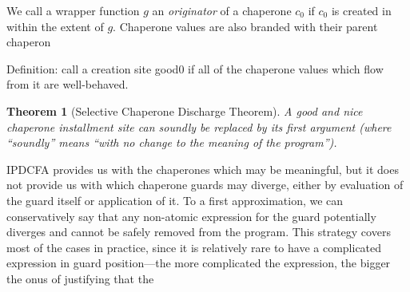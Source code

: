 \documentclass{sigplanconf}
\newtheorem{theorem}{Theorem}
\begin{document}
We call a wrapper function $g$ an \emph{originator} of a chaperone $c_0$ if $c_0$ is created in within the extent of $g$. Chaperone values are also branded with their parent chaperon

Definition: call a creation site good0 if all of the chaperone values which flow from it are well-behaved.


\begin{theorem}[Selective Chaperone Discharge Theorem]
A good and nice chaperone installment site can soundly be replaced by its first argument (where ``soundly'' means ``with no change to the meaning of the program'').
\end{theorem}







IPDCFA provides us with the chaperones which may be meaningful, but it does not provide us with which chaperone guards may diverge, either by evaluation of the guard itself or application of it.
To a first approximation, we can conservatively say that any non-atomic expression for the guard potentially diverges and cannot be safely removed from the program.
This strategy covers most of the cases in practice, since it is relatively rare to have a complicated expression in guard position---the more complicated the expression, the bigger the onus of justifying that the 


\end{document}
